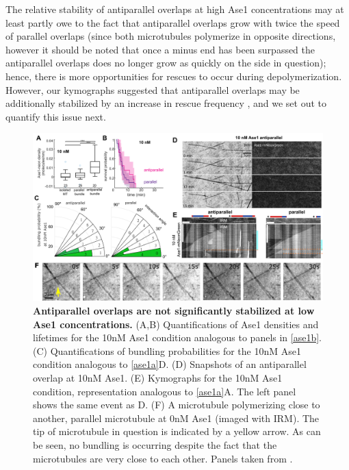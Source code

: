 The relative stability of antiparallel overlaps at high Ase1 concentrations may at least partly owe to the fact that antiparallel overlaps grow with twice the speed of parallel overlaps (since both microtubules polymerize in opposite directions, however it should be noted that once a minus end has been surpassed the antiparallel overlaps does no longer grow as quickly on the side in question); hence, there is more opportunities for rescues to occur during depolymerization. However, our kymographs suggested that antiparallel overlaps may be additionally stabilized by an increase in rescue frequency , and we set out to quantify this issue next. \par

\begin{figure}[h]
    \centering
    \includegraphics[width=1\linewidth]{Figures/ase1_1c.png}
    \caption[Antiparallel overlaps are not significantly stabilized at low Ase1 concentrations.]{
        \textbf{Antiparallel overlaps are not significantly stabilized at low Ase1 concentrations.} (A,B) Quantifications of Ase1 densities and lifetimes for the 10nM Ase1 condition analogous to panels in \autoref{ase1b}. (C) Quantifications of bundling probabilities for the 10nM Ase1 condition analogous to \autoref{ase1a}D. (D) Snapshots of an antiparallel overlap at 10nM Ase1. (E) Kymographs for the 10nM Ase1 condition, representation analogous to \autoref{ase1a}A. The left panel shows the same event as D. (F) A microtubule polymerizing close to another, parallel microtubule at 0nM Ase1 (imaged with IRM). The tip of microtubule in question is indicated by a yellow arrow. As can be seen, no bundling is occurring despite the fact that the microtubules are very close to each other. Panels taken from \cite{Krattenmacher2024}.
        }\label{ase1c}
\end{figure}

